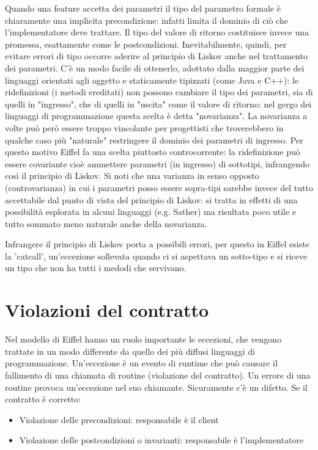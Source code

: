 \documentclass[a4paper,12pt,titlepage,oneside]{book}
\begin{document}
    Quando una feature accetta dei parametri il tipo del parametro formale è chiaramente una implicita precondizione: infatti limita il dominio di ciò che l’implementatore deve trattare. Il tipo del valore di ritorno costituisce 
    invece una promessa, esattamente come le postcondizioni. Inevitabilmente, quindi, per evitare errori di tipo occorre aderire al principio di Liskov anche nel trattamento dei parametri. C’è un modo facile di ottenerlo, 
    adottato dalla maggior parte dei linguaggi orientati agli oggetto e staticamente tipizzati (come Java e C++): le ridefinizioni (i metodi ereditati) non possono cambiare il tipo dei parametri, sia di quelli in "ingresso", 
    che di quelli in "uscita" come il valore di ritorno: nel gergo dei linguaggi di programmazione questa scelta è detta "novarianza". La novarianza a volte può però essere troppo vincolante per progettisti che troverebbero in 
    qualche caso più "naturale" restringere il dominio dei parametri di ingresso. Per questo motivo Eiffel fa una scelta piuttosto controcorrente: la ridefinizione può essere covariante cioè ammettere parametri (in ingresso) di 
    sottotipi, infrangendo così il principio di Liskov. Si noti che una varianza in senso opposto (controvarianza) in cui i parametri posso essere sopra-tipi sarebbe invece del tutto accettabile dal punto di vista del principio 
    di Liskov: si tratta in effetti di una possibilità esplorata in alcuni linguaggi (e.g. Sather) ma risultata poco utile e tutto sommato meno naturale anche della novarianza.

    Infrangere il principio di Liskov porta a possibili errori, per questo in Eiffel esiste la 'catcall', un'eccezione sollevata quando ci si aspettava un sotto-tipo e si riceve un tipo che non ha tutti i medodi che servivano.

\section{Violazioni del contratto}
    Nel modello di Eiffel hanno un ruolo importante le eccezioni, che vengono trattate in un modo differente da quello dei più diffusi linguaggi di programmazione.
    Un'eccezione è un evento di runtime che può causare il fallimento di una chiamata di routine (violazione del contratto). Un errore di una routine provoca un'eccezione nel suo chiamante.
    Sicuramente c'è un difetto.
    Se il contratto è corretto:
\begin{itemize}
    \item Violazione delle precondizioni: responsabile è il client
    \item Violazione delle postcondizioni o invarianti: responsabile è l'implementatore
\end{itemize}
\end{document}
